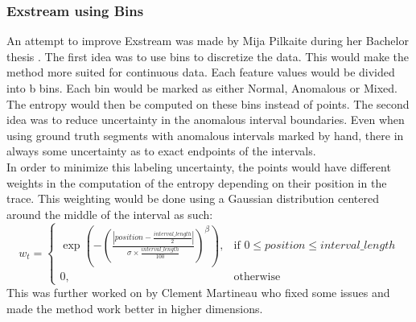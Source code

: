 \documentclass[oneside, a4paper, onecolumn, 11pt]{article}
\begin{document}
\subsubsection{Exstream using Bins}
An attempt to improve Exstream was made by Mija Pilkaite during her Bachelor thesis \cite{MijaExstream}. The first idea was to use bins to discretize the data. This would make the method more suited for continuous data. Each feature values would be divided into b bins. Each bin would be marked as either Normal, Anomalous or Mixed. The entropy would then be computed on these bins instead of points. 
The second idea was to reduce uncertainty in the anomalous interval boundaries. Even when using ground truth segments with anomalous intervals marked by hand, there in always some uncertainty as to exact endpoints of the intervals. \\
In order to minimize this labeling uncertainty, the points would have different weights in the computation of the entropy depending on their position in the trace. This weighting would be done using a Gaussian distribution centered around the middle of the interval as such:
\[
w_t =
\begin{cases}
\exp \left( - \left( \frac{| position - \frac{interval\_length}{2} |}{\sigma \times \frac{interval\_length}{100}} \right)^{\beta} \right), & \text{if } 0 \leq position \leq interval\_length \\
0, & \text{otherwise}
\end{cases}
\]
This was further worked on by Clement Martineau who fixed some issues and made the method work better in higher dimensions.\\
\end{document}
